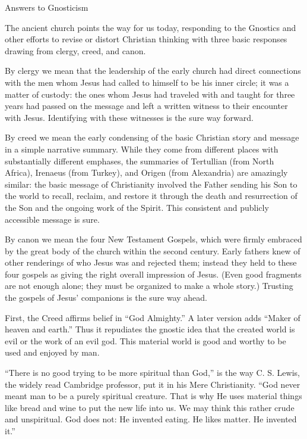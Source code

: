 \begin{sidebar}{Answers to Gnosticism}

The ancient church points the way for us today, responding to the Gnostics and other efforts to
revise or distort Christian thinking with three basic responses drawing from clergy, creed, and
canon.

By clergy we mean that the leadership of the early church had direct connections with the men whom
Jesus had called to himself to be his inner circle; it was a matter of custody: the ones whom Jesus
had traveled with and taught for three years had passed on the message and left a written witness to
their encounter with Jesus. Identifying with these witnesses is the sure way forward.

By creed we mean the early condensing of the basic Christian story and message in a simple narrative
summary. While they come from different places with substantially different emphases, the summaries
of Tertullian (from North Africa), Irenaeus (from Turkey), and Origen (from Alexandria) are
amazingly similar: the basic message of Christianity involved the Father sending his Son to the
world to recall, reclaim, and restore it through the death and resurrection of the Son and the
ongoing work of the Spirit. This consistent and publicly accessible message is sure.

By canon we mean the four New Testament Gospels, which were firmly embraced by the great body of the
church within the second century. Early fathers knew of other renderings of who Jesus was and
rejected them; instead they held to these four gospels as giving the right overall impression of
Jesus. (Even good fragments are not enough alone; they must be organized to make a whole story.)
Trusting the gospels of Jesus’ companions is the sure way ahead.
\end{sidebar}

First, the Creed affirms belief in “God Almighty.” A later version adds “Maker of heaven and earth.”
Thus it repudiates the gnostic idea that the created world is evil or the work of an evil god. This
material world is good and worthy to be used and enjoyed by man.

“There is no good trying to be more spiritual than God,” is the way C. S. Lewis, the widely read
Cambridge professor, put it in his Mere Christianity. “God never meant man to be a purely spiritual
creature. That is why He uses material things like bread and wine to put the new life into us. We
may think this rather crude and unspiritual. God does not: He invented eating. He likes matter. He
invented it.”

